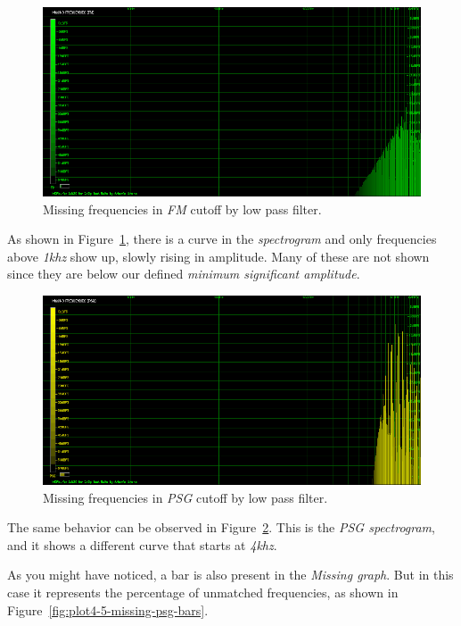 \documentclass[10pt,a4paper]{report}
\newcommand{\khz}[1]{\textit{\mbox{#1\acrshort{khz}}}}
\begin{document}
\begin{figure}[H]
	\centering
	\includegraphics[width=1.0\linewidth]{images/interpretation/Plot4-4-Missing-FM.png}
	\caption[Missing FM]{Missing frequencies in \textit{FM} cutoff by low pass filter.}
	\label{fig:plot4-4-missing-fm}
\end{figure}

As shown in Figure~\ref{fig:plot4-4-missing-fm}, there is a curve in the \textit{spectrogram} and only frequencies above \khz{1} show up, slowly rising in amplitude. Many of these are not shown since they are below our defined \textit{minimum significant amplitude}.

\begin{figure}[H]
	\centering
	\includegraphics[width=1.0\linewidth]{images/interpretation/Plot4-5-Missing-PSG.png}
	\caption[Missing PSG]{Missing frequencies in \textit{PSG} cutoff by low pass filter.}
	\label{fig:plot4-5-missing-psg}
\end{figure}

The same behavior can be observed in Figure~\ref{fig:plot4-5-missing-psg}. This is the \textit{PSG spectrogram}, and it shows a different curve that starts at \khz{4}. 

As you might have noticed, a bar is also present in the \textit{Missing graph}. But in this case it represents the percentage of unmatched frequencies, as shown in Figure~\ref{fig:plot4-5-missing-psg-bars}.
\end{document}
